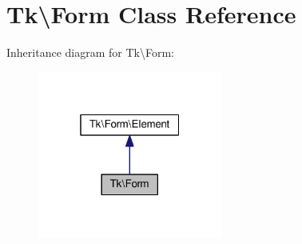 \hypertarget{classTk_1_1Form}{\section{Tk\textbackslash{}Form Class Reference}
\label{classTk_1_1Form}
}


Inheritance diagram for Tk\textbackslash{}Form\+:\nopagebreak
\begin{figure}[H]
\begin{center}
\leavevmode
\includegraphics[width=172pt]{classTk_1_1Form__inherit__graph}
\end{center}
\end{figure}
